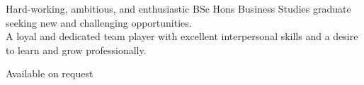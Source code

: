 \documentclass[a4paper]{limecv}
\begin{document}

\begin{cvSidebar}

  \begin{cvProfile}
    Hard-working, ambitious, and enthusiastic BSc Hons Business Studies
    graduate seeking new and challenging opportunities.\\
    A loyal and dedicated team player with excellent interpersonal 
    skills and a desire to learn and grow professionally.
  \end{cvProfile}
  
  \begin{cvContact}
\end{cvContact}

  \begin{cvReferencesSB}
    Available on request
  \end{cvReferencesSB}

\end{cvSidebar}
\end{document}

